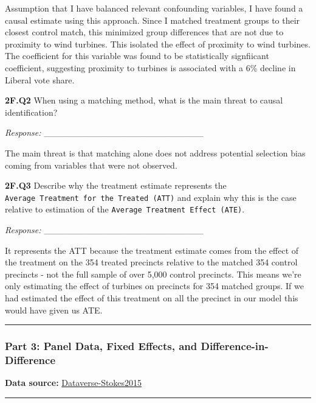 \documentclass[
  letterpaper,
  DIV=11,
  numbers=noendperiod]{scrartcl}
\begin{document}
Assumption that I have balanced relevant confounding variables, I have
found a causal estimate using this approach. Since I matched treatment
groups to their closest control match, this minimized group differences
that are not due to proximity to wind turbines. This isolated the effect
of proximity to wind turbines. The coefficient for this variable was
found to be statistically signfiicant coefficient, suggesting proximity
to turbines is associated with a 6\% decline in Liberal vote share.

\textbf{2F.Q2} When using a matching method, what is the main threat to
causal identification?

\emph{Response:} \_\_\_\_\_\_\_\_\_\_\_\_\_\_\_\_\_\_\_\_\_\_\_\_\_

The main threat is that matching alone does not address potential
selection bias coming from variables that were not observed.

\textbf{2F.Q3} Describe why the treatment estimate represents the
\texttt{Average\ Treatment\ for\ the\ Treated\ (ATT)} and explain why
this is the case relative to estimation of the
\texttt{Average\ Treatment\ Effect\ (ATE)}.

\emph{Response:} \_\_\_\_\_\_\_\_\_\_\_\_\_\_\_\_\_\_\_\_\_\_\_\_\_

It represents the ATT because the treatment estimate comes from the
effect of the treatment on the 354 treated precincts relative to the
matched 354 control precincts - not the full sample of over 5,000
control precincts. This means we're only estimating the effect of
turbines on precincts for 354 matched groups. If we had estimated the
effect of this treatment on all the precinct in our model this would
have given us ATE.

\begin{center}\rule{0.5\linewidth}{0.5pt}\end{center}

\subsubsection{Part 3: Panel Data, Fixed Effects, and
Difference-in-Difference}\label{part-3-panel-data-fixed-effects-and-difference-in-difference}

\textbf{Data source:}
\href{https://dataverse.harvard.edu/dataset.xhtml?persistentId=doi:10.7910/DVN/SDUGCC}{Dataverse-Stokes2015}

\begin{center}\rule{0.5\linewidth}{0.5pt}\end{center}
\end{document}
